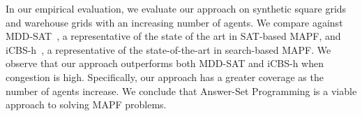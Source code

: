 In our empirical evaluation, we evaluate our approach on synthetic square grids and warehouse grids with an increasing number of agents. We compare against MDD-SAT~\cite{SurynekFSB16}, a representative of the state of the art in SAT-based MAPF, and iCBS-h~\cite{FelnerLB00KK18}, a representative of the state-of-the-art in search-based MAPF. We observe that our approach outperforms both MDD-SAT and iCBS-h when congestion is high. Specifically, our approach has a greater coverage as the number of agents increase. We conclude that Answer-Set Programming is a viable approach to solving MAPF problems.
